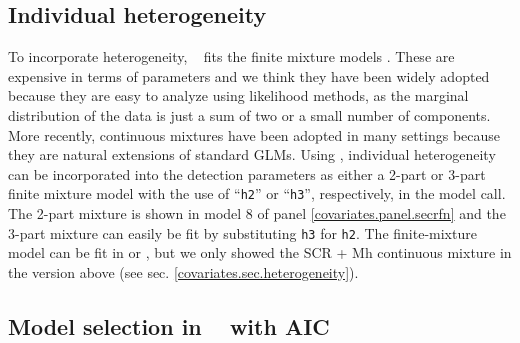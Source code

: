\begin{comment}
There are a few ways that one could
specify the model with sex-specific parameters  in \mbox{\tt secr} (M. Efford, pers. comm).  One way is that we could
list sex as a categorical individual covariate in a Huggins-Alho type
model \citep{borchers_efford:2008}.
 A similar approach is to treat males and 
females as groups (in \secr~ denoted by ``g''), specify the
model as $model = list(D~g, g0~g, \sigma~g)$ and list \mbox{\tt groups = 'sex'}
where we have specified sex as a 2-level individual covariate.    The \secr~ manual suggests that for many purposes,
using the `session' implementation is equivalent to the 'groups' with the caveat that the latter is often simpler
to implement partially due to the fact that multi-session models require the detector array and mask to be 
specified separately for each session.
\end{comment}


\subsection{Individual heterogeneity}
\label{covariates.sec.secrH2}

To incorporate heterogeneity, \secr~ fits the
finite mixture models \citep{norris_pollock:1996,
  pledger:2000}. These are expensive in terms of parameters and we think 
they have been widely adopted because they are easy to analyze using
likelihood methods, as the marginal distribution of the data is just a
sum of two or a small number of components.
More recently, continuous mixtures have been adopted in
many settings because they are natural extensions of standard GLMs. 
Using \secr,  individual heterogeneity can be incorporated
into the detection parameters as either a 2-part or 3-part finite
mixture model 
with the use of ``\mbox{\tt h2}'' or
``\mbox{\tt h3}'', respectively, in the
model call.   The 2-part mixture is shown in model 8 of panel
\ref{covariates.panel.secrfn} and the 3-part mixture can easily be fit by
substituting \mbox{\tt h3} for \mbox{\tt h2}.  
The finite-mixture model 
can be fit in \jags or \bugs, but we only showed
the SCR + Mh continuous mixture in the version above (see
sec. \ref{covariates.sec.heterogeneity}).



\subsection{Model selection in \secr~ with AIC}

